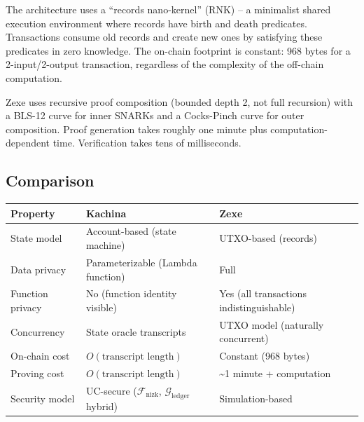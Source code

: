 \documentclass[
  11pt,
  openany]{report}
\begin{document}
The architecture uses a ``records nano-kernel'' (RNK) -- a minimalist shared
execution environment where records have birth and death predicates.
Transactions consume old records and create new ones by satisfying these
predicates in zero knowledge. The on-chain footprint is constant: 968 bytes for
a 2-input/2-output transaction, regardless of the complexity of the off-chain
computation.

Zexe uses recursive proof composition (bounded depth 2, not full recursion) with
a BLS-12 curve for inner SNARKs and a Cocks-Pinch curve for outer composition.
Proof generation takes roughly one minute plus computation-dependent time.
Verification takes tens of milliseconds.

\subsection{Comparison}\label{comparison}

\begin{longtable}[]{@{}
  >{\raggedright\arraybackslash}p{}
  >{\raggedright\arraybackslash}p{}
  >{\raggedright\arraybackslash}p{}@{}}
\toprule\noalign{}
\begin{minipage}[b]{\linewidth}\raggedright
Property
\end{minipage} & \begin{minipage}[b]{\linewidth}\raggedright
Kachina
\end{minipage} & \begin{minipage}[b]{\linewidth}\raggedright
Zexe
\end{minipage} \\
\midrule\noalign{}
\arrayrulecolor{MidnightBlue}\midrule\arrayrulecolor{MidnightBorder}
\endhead
\bottomrule\noalign{}
\endlastfoot
State model & Account-based (state machine) & UTXO-based (records) \\
Data privacy & Parameterizable (Lambda function) & Full \\
Function privacy & No (function identity visible) & Yes (all transactions
indistinguishable) \\
Concurrency & State oracle transcripts & UTXO model (naturally concurrent) \\
On-chain cost & \(O(\text{transcript length})\) & Constant (968 bytes) \\
Proving cost & \(O(\text{transcript length})\) & \textasciitilde1 minute +
computation \\
Security model & UC-secure (\(\mathcal{F}_\text{nizk}\),
\(\mathcal{G}_\text{ledger}\) hybrid) & Simulation-based \\
\end{longtable}
\end{document}
